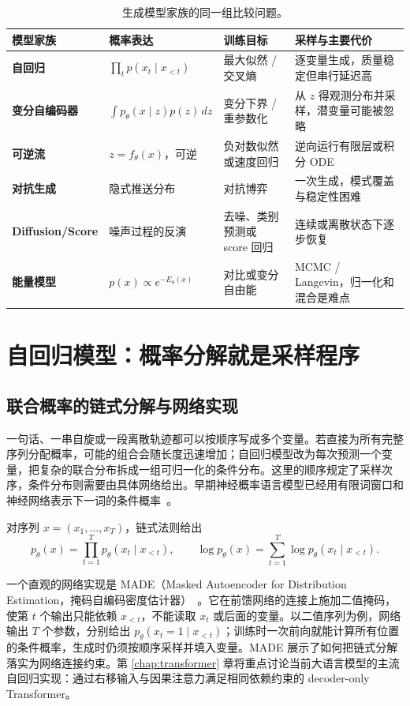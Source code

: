 \begin{table}[ht]
\centering\small
\begin{tabularx}{\textwidth}{>{\bfseries}p{24mm} X X X}
\toprule
模型家族 & 概率表达 & 训练目标 & 采样与主要代价\\
\midrule
自回归 & $\prod_t p(x_t\mid x_{<t})$ & 最大似然 / 交叉熵 & 逐变量生成，质量稳定但串行延迟高\\
变分自编码器 & $\int p_\theta(x\mid z)p(z)\,dz$ & 变分下界 / 重参数化 & 从 $z$ 得观测分布并采样，潜变量可能被忽略\\
可逆流 & $z=f_\theta(x)$，可逆 & 负对数似然或速度回归 & 逆向运行有限层或积分 ODE\\
对抗生成 & 隐式推送分布 & 对抗博弈 & 一次生成，模式覆盖与稳定性困难\\
Diffusion/\allowbreak Score & 噪声过程的反演 & 去噪、类别预测或 score 回归 & 连续或离散状态下逐步恢复\\
能量模型 & $p(x)\propto e^{-E_\theta(x)}$ & 对比或变分自由能 & MCMC / Langevin，归一化和混合是难点\\
\bottomrule
\end{tabularx}
\caption{生成模型家族的同一组比较问题。}
\label{tab:model-families}
\end{table}

\section{自回归模型：概率分解就是采样程序}
\label{sec:autoregressive}

\subsection{联合概率的链式分解与网络实现}

一句话、一串自旋或一段离散轨迹都可以按顺序写成多个变量。若直接为所有完整序列分配概率，可能的组合会随长度迅速增加；自回归模型改为每次预测一个变量，把复杂的联合分布拆成一组可归一化的条件分布。这里的顺序规定了采样次序，条件分布则需要由具体网络给出。早期神经概率语言模型已经用有限词窗口和神经网络表示下一词的条件概率~\cite{bengio2003neural}。

对序列 \(x=(x_1,\ldots,x_T)\)，链式法则给出
\begin{equation}
 p_\theta(x)=\prod_{t=1}^{T}p_\theta(x_t\mid x_{<t}),\qquad
 \log p_\theta(x)=\sum_{t=1}^{T}\log p_\theta(x_t\mid x_{<t}).
\end{equation}

一个直观的网络实现是 MADE（Masked Autoencoder for Distribution Estimation，掩码自编码密度估计器）~\cite{germain2015made}。它在前馈网络的连接上施加二值掩码，使第 \(t\) 个输出只能依赖 \(x_{<t}\)，不能读取 \(x_t\) 或后面的变量。以二值序列为例，网络输出 \(T\) 个参数，分别给出 \(p_\theta(x_t=1\mid x_{<t})\)；训练时一次前向就能计算所有位置的条件概率，生成时仍须按顺序采样并填入变量。MADE 展示了如何把链式分解落实为网络连接约束。第 \ref{chap:transformer} 章将重点讨论当前大语言模型的主流自回归实现：通过右移输入与因果注意力满足相同依赖约束的 decoder-only Transformer。

